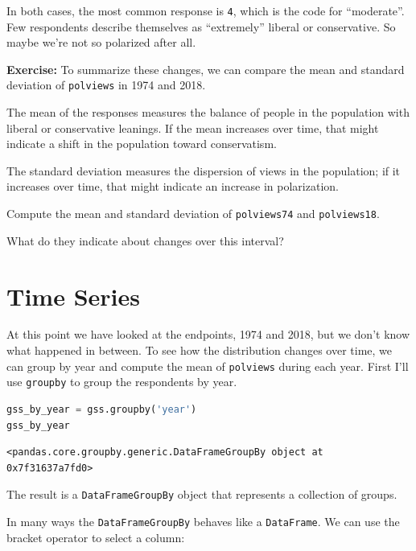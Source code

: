 In both cases, the most common response is \passthrough{\lstinline!4!},
which is the code for ``moderate''. Few respondents describe themselves
as ``extremely'' liberal or conservative. So maybe we're not so
polarized after all.

\textbf{Exercise:} To summarize these changes, we can compare the mean
and standard deviation of \passthrough{\lstinline!polviews!} in 1974 and
2018.

The mean of the responses measures the balance of people in the
population with liberal or conservative leanings. If the mean increases
over time, that might indicate a shift in the population toward
conservatism.

The standard deviation measures the dispersion of views in the
population; if it increases over time, that might indicate an increase
in polarization.

Compute the mean and standard deviation of
\passthrough{\lstinline!polviews74!} and
\passthrough{\lstinline!polviews18!}.

What do they indicate about changes over this interval?

\hypertarget{time-series}{%
\section{Time Series}\label{time-series}}

At this point we have looked at the endpoints, 1974 and 2018, but we
don't know what happened in between. To see how the distribution changes
over time, we can group by year and compute the mean of
\passthrough{\lstinline!polviews!} during each year. First I'll use
\passthrough{\lstinline!groupby!} to group the respondents by year.

\begin{lstlisting}[language=Python,style=source]
gss_by_year = gss.groupby('year')
gss_by_year
\end{lstlisting}

\begin{lstlisting}[style=output]
<pandas.core.groupby.generic.DataFrameGroupBy object at 0x7f31637a7fd0>
\end{lstlisting}

The result is a \passthrough{\lstinline!DataFrameGroupBy!} object that
represents a collection of groups.

In many ways the \passthrough{\lstinline!DataFrameGroupBy!} behaves like
a \passthrough{\lstinline!DataFrame!}. We can use the bracket operator
to select a column:

